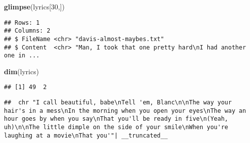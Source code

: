 \documentclass[]{article}
\newenvironment{Shaded}{\begin{snugshade}}{\end{snugshade}}
\newcommand{\DataTypeTok}[1]{\textcolor[rgb]{0.13,0.29,0.53}{#1}}
\newcommand{\DecValTok}[1]{\textcolor[rgb]{0.00,0.00,0.81}{#1}}
\newcommand{\KeywordTok}[1]{\textcolor[rgb]{0.13,0.29,0.53}{\textbf{#1}}}
\newcommand{\NormalTok}[1]{#1}
\newcommand{\OperatorTok}[1]{\textcolor[rgb]{0.81,0.36,0.00}{\textbf{#1}}}
\begin{document}
\begin{Shaded}
\begin{Highlighting}[]
\KeywordTok{glimpse}\NormalTok{(lyrics[}\DecValTok{30}\NormalTok{,])}
\end{Highlighting}
\end{Shaded}

\begin{verbatim}
## Rows: 1
## Columns: 2
## $ FileName <chr> "davis-almost-maybes.txt"
## $ Content  <chr> "Man, I took that one pretty hard\nI had another one in ...
\end{verbatim}

\begin{Shaded}
\begin{Highlighting}[]
\KeywordTok{dim}\NormalTok{(lyrics)}
\end{Highlighting}
\end{Shaded}

\begin{verbatim}
## [1] 49  2
\end{verbatim}

\begin{Shaded}
\end{Shaded}

\begin{verbatim}
##  chr "I call beautiful, babe\nTell 'em, Blanc\n\nThe way your hair's in a mess\nIn the morning when you open your eyes\nThe way an hour goes by when you say\nThat you'll be ready in five\n(Yeah, uh)\n\nThe little dimple on the side of your smile\nWhen you're laughing at a movie\nThat you'"| __truncated__
\end{verbatim}
\end{document}
